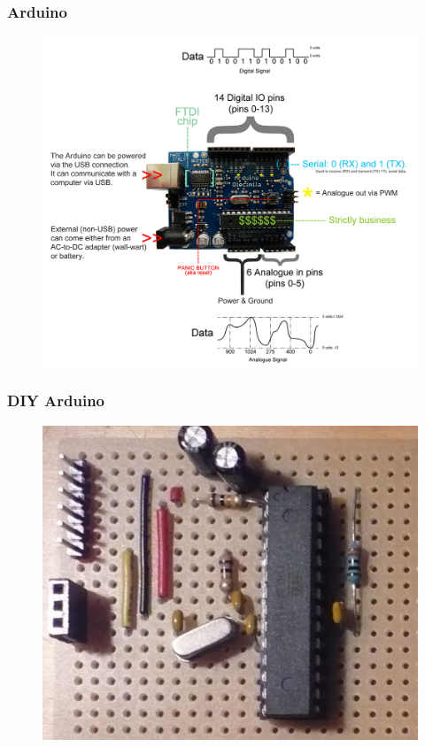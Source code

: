 \begin{frame}
	\frametitle{Arduino}
	
	 \begin{figure}
		\includegraphics[scale=.2]{assets/map} 
	\end{figure}
\end{frame}

\begin{frame}
	\frametitle{DIY Arduino}
	
	 \begin{figure}
		\includegraphics[scale=.2]{assets/diy} 
	\end{figure}
\end{frame}

